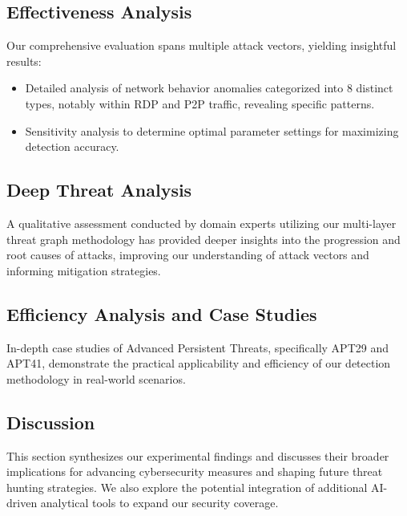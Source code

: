 \subsection{Effectiveness Analysis}\label{sec:effect}
Our comprehensive evaluation spans multiple attack vectors, yielding insightful results:
\begin{itemize}
    \item Detailed analysis of network behavior anomalies categorized into 8 distinct types, notably within RDP and P2P traffic, revealing specific patterns.
    \item Sensitivity analysis to determine optimal parameter settings for maximizing detection accuracy.
\end{itemize}

\subsection{Deep Threat Analysis}\label{sec:deep-threat}
A qualitative assessment conducted by domain experts utilizing our multi-layer threat graph methodology has provided deeper insights into the progression and root causes of attacks, improving our understanding of attack vectors and informing mitigation strategies.

\subsection{Efficiency Analysis and Case Studies}\label{sec:effi}
In-depth case studies of Advanced Persistent Threats, specifically APT29 and APT41, demonstrate the practical applicability and efficiency of our detection methodology in real-world scenarios.

\subsection{Discussion}\label{sec:dis}
This section synthesizes our experimental findings and discusses their broader implications for advancing cybersecurity measures and shaping future threat hunting strategies. We also explore the potential integration of additional AI-driven analytical tools to expand our security coverage.

